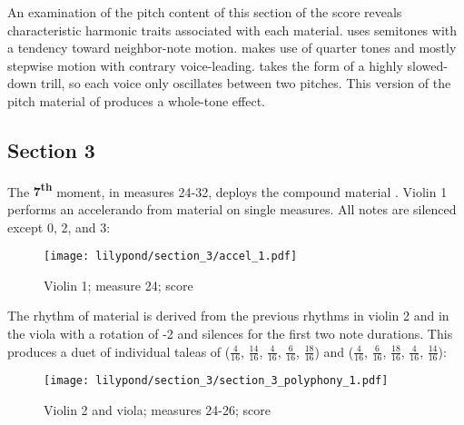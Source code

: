 An examination of the pitch content of this section of the score reveals characteristic harmonic traits associated with each material.  uses semitones with a tendency toward neighbor-note motion.  makes use of quarter tones and mostly stepwise motion with contrary voice-leading.  takes the form of a highly slowed-down trill, so each voice only oscillates between two pitches. This version of the pitch material of  produces a whole-tone effect.


\subsection{Section 3}

The \textbf{7\textsuperscript{th}} moment, in measures 24-32, deploys the compound material . Violin 1 performs an accelerando from material  on single measures. All notes are silenced except 0, 2, and 3:

\setcounter{figure}{18}
\setcounter{subFigure}{0}
\renewcommand{\thefigure}{\thechapter.\arabic{figure}}
\begin{figure}[H]
    \texttt{[image: lilypond/section\_3/accel\_1.pdf]}
    \caption{Violin 1; measure 24; score}
    \label{fig:section-3-accel}
\end{figure}

The rhythm of  material is derived from the previous rhythms in violin 2 and in the viola with a rotation of -2 and silences for the first two note durations. This produces a duet of individual taleas of ($\frac{4}{16}$, $\frac{14}{16}$, $\frac{4}{16}$, $\frac{6}{16}$, $\frac{18}{16}$) and ($\frac{4}{16}$, $\frac{6}{16}$, $\frac{18}{16}$, $\frac{4}{16}$, $\frac{14}{16}$):

\setcounter{figure}{19}
\begin{figure}[H]
    \texttt{[image: lilypond/section\_3/section\_3\_polyphony\_1.pdf]}
    \caption{Violin 2 and viola; measures 24-26; score}
    \label{fig:section-3-accel-2}
\end{figure}

